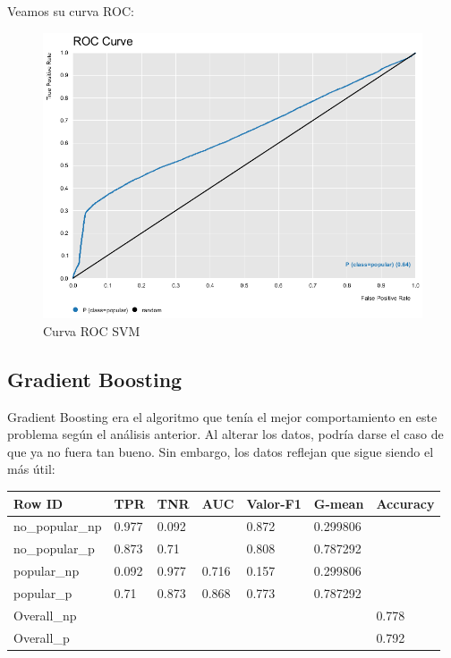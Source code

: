 Veamos su curva ROC:
	
\begin{figure}[H] %
	\centering
	\includegraphics[scale=0.38]{rc-svm.png}  %
	\caption{Curva ROC SVM} 
	\label{fig:rocsvm}
\end{figure}

\subsection{Gradient Boosting}

Gradient Boosting era el algoritmo que tenía el mejor comportamiento en este problema según el análisis anterior. Al alterar los datos, podría darse el caso de que ya no fuera tan bueno. Sin embargo, los datos reflejan que sigue siendo el más útil:

\begin{table}[H]
	\centering
	\begin{tabular}{|l|l|l|l|l|l|l|}
		\hline
		Row ID          & TPR   & TNR   & AUC   & Valor-F1 & G-mean   & Accuracy \\ \hline
		no\_popular\_np & 0.977 & 0.092 &       & 0.872    & 0.299806 &          \\ \hline
		no\_popular\_p  & 0.873 & 0.71  &       & 0.808    & 0.787292 &          \\ \hline
		popular\_np     & 0.092 & 0.977 & 0.716 & 0.157    & 0.299806 &          \\ \hline
		popular\_p      & 0.71  & 0.873 & 0.868 & 0.773    & 0.787292 &          \\ \hline
		Overall\_np     &       &       &       &          &          & 0.778    \\ \hline
		Overall\_p      &       &       &       &          &          & 0.792    \\ \hline
	\end{tabular}
\end{table}

